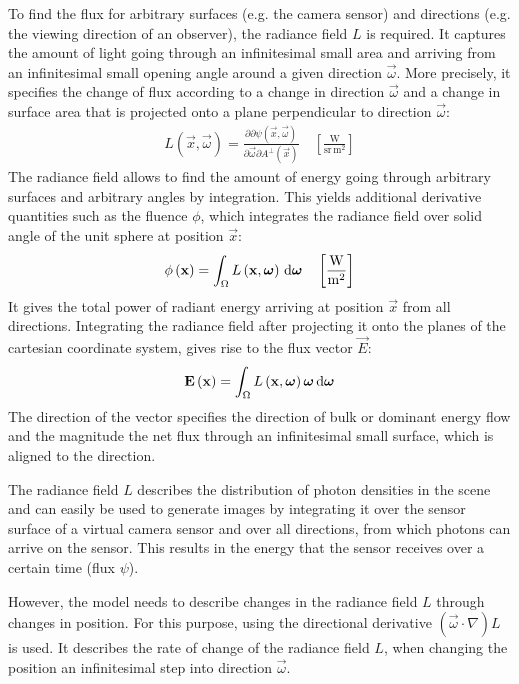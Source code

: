 To find the flux for arbitrary surfaces (e.g. the camera sensor) and directions (e.g. the viewing direction of an observer), the radiance field $L$ is required. It captures the amount of light going through an infinitesimal small area and arriving from an infinitesimal small opening angle around a given direction $\vec{\omega}$. More precisely, it specifies the change of flux according to a change in direction $\vec{\omega}$ and a change in surface area that is projected onto a plane perpendicular to direction $\vec{\omega}$:
\begin{align*}
L\left(\vec{x}, \vec{\omega}\right) = \frac{\partial\partial\psi\left(\vec{x}, \vec{\omega}\right)}{\partial\vec{\omega}\partial A^\perp\left(\vec{x}\right)}
\quad
\left[\frac{\si{\watt}}{\si{\steradian}\, \si{\meter}^2}\right]
\end{align*}
The radiance field allows to find the amount of energy going through arbitrary surfaces and arbitrary angles by integration. This yields additional derivative quantities such as the fluence $\phi$, which integrates the radiance field over solid angle of the unit sphere at position $\vec{x}$:
\begin{align*}
\phi\left(\boldsymbol{\mathbf{x}}\right) = \int_\Omega L\left(\boldsymbol{\mathbf{x}}, \boldsymbol{\mathbf{\omega}}\right) \,\mathrm{d}\boldsymbol{\mathbf{\omega}}
\quad
\left[\frac{\si{\watt}}{\si{\meter}^2}\right]
\end{align*}
It gives the total power of radiant energy arriving at position $\vec{x}$ from all directions. Integrating the radiance field after projecting it onto the planes of the cartesian coordinate system, gives rise to the flux vector $\vec{E}$:
\begin{align*}
\boldsymbol{\mathbf{E}}\left(\boldsymbol{\mathbf{x}}\right) = \int_\Omega L\left(\boldsymbol{\mathbf{x}}, \boldsymbol{\mathbf{\omega}}\right)\boldsymbol{\mathbf{\omega}} \,\mathrm{d}\boldsymbol{\mathbf{\omega}}
\end{align*}
The direction of the vector specifies the direction of bulk or dominant energy flow and the magnitude the net flux through an infinitesimal small surface, which is aligned to the direction.

The radiance field $L$ describes the distribution of photon densities in the scene and can easily be used to generate images by integrating it over the sensor surface of a virtual camera sensor and over all directions, from which photons can arrive on the sensor. This results in the energy that the sensor receives over a certain time (flux $\psi$).


However, the model needs to describe changes in the radiance field $L$ through changes in position. For this purpose, using the directional derivative $\left(\vec{\omega}\cdot\nabla\right)L$ is used. It describes the rate of change of the radiance field $L$, when changing the position an infinitesimal step into direction $\vec{\omega}$.

